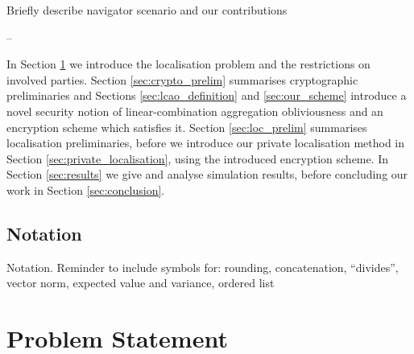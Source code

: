 \documentclass[twocolumn]{autart}
\begin{document}
Briefly describe navigator scenario and our contributions

--

In Section \ref{sec:problem_statement} we introduce the localisation problem and the restrictions on involved parties. Section \ref{sec:crypto_prelim} summarises cryptographic preliminaries and Sections \ref{sec:lcao_definition} and \ref{sec:our_scheme} introduce a novel security notion of linear-combination aggregation obliviousness and an encryption scheme which satisfies it. Section \ref{sec:loc_prelim} summarises localisation preliminaries, before we introduce our private localisation method in Section \ref{sec:private_localisation}, using the introduced encryption scheme. In Section \ref{sec:results} we give and analyse simulation results, before concluding our work in Section \ref{sec:conclusion}.

% 
% 

\subsection{Notation}
Notation. Reminder to include symbols for: rounding, concatenation, ``divides'', vector norm, expected value and variance, ordered list


% 
%                                     
%                                     
%                                     
% 

\section{Problem Statement} \label{sec:problem_statement}
\end{document}
